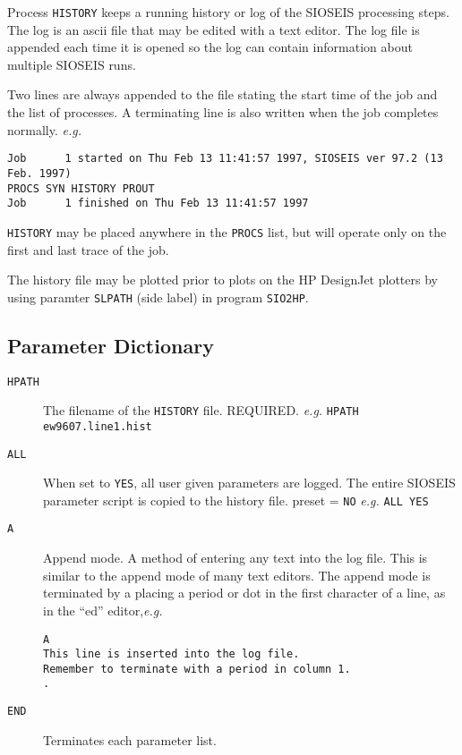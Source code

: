 Process \texttt{HISTORY} keeps a running history or log of the SIOSEIS
processing steps.  The log is an \gls{ascii} file that may be edited
with a text editor.  The log file is appended each time it is opened
so the log can contain information about multiple SIOSEIS runs.

Two lines are always appended to the file stating the start
time of the job and the list of processes.  A terminating line is
also written when the job completes normally.  \textit{e.g.}
\begin{verbatim}
Job      1 started on Thu Feb 13 11:41:57 1997, SIOSEIS ver 97.2 (13 Feb. 1997)
PROCS SYN HISTORY PROUT
Job      1 finished on Thu Feb 13 11:41:57 1997
\end{verbatim}

\texttt{HISTORY} may be placed anywhere in the \texttt{PROCS} list, but will
operate only on the first and last trace of the job.

The history file may be plotted prior to plots on the HP DesignJet
plotters by using paramter \texttt{SLPATH} (side label) in program \texttt{SIO2HP}.

\subsection{Parameter Dictionary}

\begin{description}
\item[\texttt{HPATH}] The filename of the \texttt{HISTORY} file.
         REQUIRED.      \textit{e.g.}  \texttt{HPATH ew9607.line1.hist}

\item[\texttt{ALL}] When set to \texttt{YES}, all user given parameters are
         logged.  The entire SIOSEIS parameter script is
         copied to the history file.
         \Gls{preset} = \texttt{NO}       \textit{e.g.}  \texttt{ALL YES}

\item[\texttt{A}] Append mode.  A method of entering any text into the log
         file.  This is similar to the append mode of many text
         editors.  The append mode is terminated by a placing
         a period or dot in the first character of a line, as
         in the ``ed'' editor,\textit{e.g.}
\begin{verbatim}
A
This line is inserted into the log file.
Remember to terminate with a period in column 1.
.
\end{verbatim}

\item[\texttt{END}] Terminates each parameter list.
\end{description}

